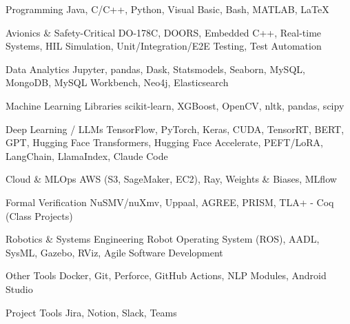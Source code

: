 


\begin{cvskills}


\cvskill
{Programming} %
{Java, C/C++, Python, Visual Basic, Bash, MATLAB, LaTeX} %


\cvskill
{Avionics \& Safety-Critical}
{DO-178C, DOORS, Embedded C++, Real-time Systems, HIL Simulation, Unit/Integration/E2E Testing, Test Automation}



\cvskill
{Data Analytics}
{Jupyter, pandas, Dask, Statsmodels, Seaborn, MySQL, MongoDB, MySQL Workbench, Neo4j, Elasticsearch}


\cvskill
{Machine Learning Libraries}
{scikit-learn, XGBoost, OpenCV, nltk, pandas, scipy}

\cvskill
{Deep Learning / LLMs}
{TensorFlow, PyTorch, Keras, CUDA, TensorRT, BERT, GPT, Hugging Face Transformers, Hugging Face Accelerate, PEFT/LoRA, LangChain, LlamaIndex, Claude Code}

\cvskill
{Cloud \& MLOps}
{AWS (S3, SageMaker, EC2), Ray, Weights \& Biases, MLflow}

\cvskill
{Formal Verification}
{NuSMV/nuXmv, Uppaal, AGREE, PRISM, TLA+ - Coq (Class Projects)}

\cvskill
{Robotics \& Systems Engineering}
{Robot Operating System (ROS), AADL, SysML, Gazebo, RViz, Agile Software Development}

\cvskill
{Other Tools}
{Docker, Git, Perforce, GitHub Actions, NLP Modules, Android Studio}

\cvskill
{Project Tools}
{Jira, Notion, Slack, Teams}





\end{cvskills}